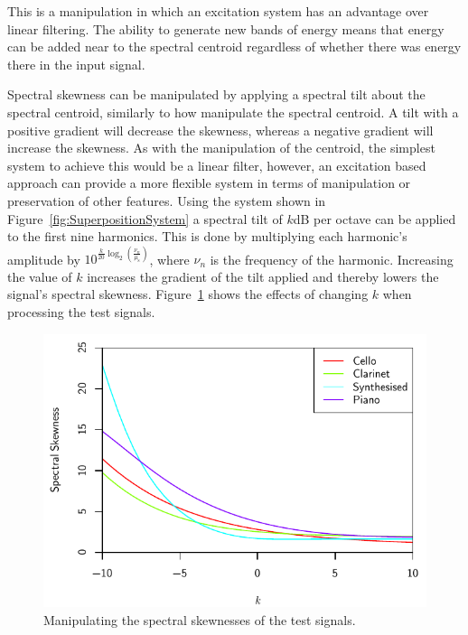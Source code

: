 			This is a manipulation in which an excitation system has an advantage over linear filtering. The
			ability to generate new bands of energy means that energy can be added near to the spectral
			centroid regardless of whether there was energy there in the input signal.

			Spectral skewness can be manipulated by applying a spectral tilt about the spectral centroid,
			similarly to how \citet{williams2007perceptually} manipulate the spectral centroid. A tilt with a
			positive gradient will decrease the skewness, whereas a negative gradient will increase the
			skewness. As with the manipulation of the centroid, the simplest system to achieve this would be a
			linear filter, however, an excitation based approach can provide a more flexible system in terms of
			manipulation or preservation of other features. Using the system shown in
			Figure~\ref{fig:SuperpositionSystem} a spectral tilt of $k$dB per octave can be applied to the
			first nine harmonics. This is done by multiplying each harmonic's amplitude by
			$10^{\frac{k}{20}\log_{2} \left( \frac{\nu_{n}}{\mu_{\mathrm{s}}} \right)}$, where $\nu_{n}$ is the
			frequency of the harmonic. Increasing the value of $k$ increases the gradient of the tilt applied
			and thereby lowers the signal's spectral skewness.  Figure~\ref{fig:MoveSkewnesses} shows the
			effects of changing $k$ when processing the test signals.

			\begin{figure}[h!]
				\centering
				\includegraphics{chapter6/Images/MoveSkewnesses.pdf}
				\caption{Manipulating the spectral skewnesses of the test signals.}
				\label{fig:MoveSkewnesses}
			\end{figure}

